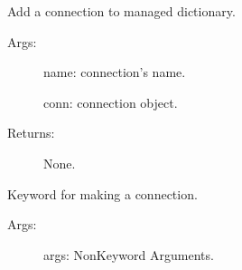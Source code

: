 \documentclass[letterpaper,10pt,english]{sphinxmanual}
\begin{document}
\begin{fulllineitems}

\begin{fulllineitems}
\label{\detokenize{QConnectBase:QConnectBase.connection_manager.ConnectionManager.ROBOT_LIBRARY_SCOPE}}
\end{fulllineitems}


\begin{fulllineitems}
\label{\detokenize{QConnectBase:QConnectBase.connection_manager.ConnectionManager.add_connection}}
\sphinxAtStartPar
Add a connection to managed dictionary.
\begin{description}
\item[{Args:}] \leavevmode
\sphinxAtStartPar
name: connection’s name.

\sphinxAtStartPar
conn: connection object.

\item[{Returns:}] \leavevmode
\sphinxAtStartPar
None.

\end{description}

\end{fulllineitems}


\begin{fulllineitems}
\label{\detokenize{QConnectBase:QConnectBase.connection_manager.ConnectionManager.connect}}
\sphinxAtStartPar
Keyword for making a connection.
\begin{description}
\item[{Args:}] \leavevmode
\sphinxAtStartPar
args:   Non\sphinxhyphen{}Keyword Arguments.


\end{description}
\end{fulllineitems}
\end{fulllineitems}
\end{document}
